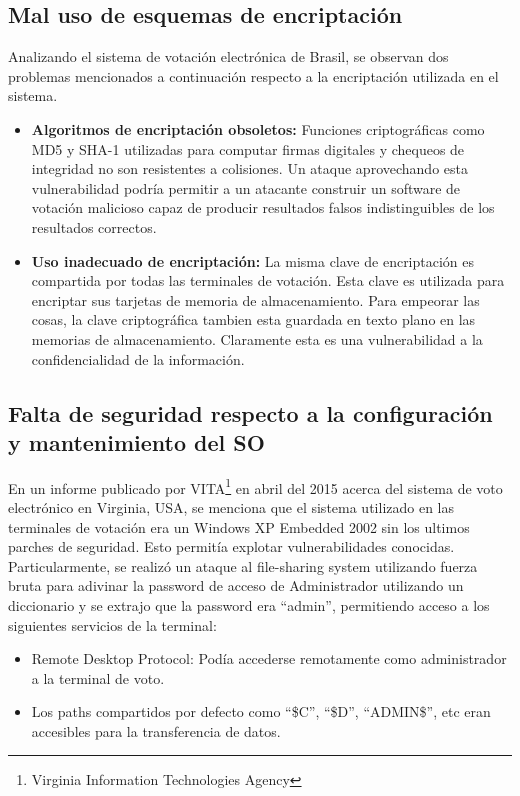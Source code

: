 \subsection{Mal uso de esquemas de encriptación}
Analizando el sistema de votación electrónica de Brasil, se observan dos problemas mencionados a continuación respecto a la encriptación utilizada en el sistema\cite{aranha}.
\begin{itemize}
	\item \textbf{Algoritmos de encriptación obsoletos:} Funciones criptográficas como MD5 y SHA-1 utilizadas para computar firmas digitales y chequeos de integridad no son resistentes a colisiones. Un ataque aprovechando esta vulnerabilidad podría permitir a un atacante construir un software de votación malicioso capaz de producir resultados falsos indistinguibles de los resultados correctos.
	\item \textbf{Uso inadecuado de encriptación: } La misma clave de encriptación es compartida por todas las terminales de votación. Esta clave es utilizada para encriptar sus tarjetas de memoria de almacenamiento. Para empeorar las cosas, la clave criptográfica tambien esta guardada en texto plano en las memorias de almacenamiento. Claramente esta es una vulnerabilidad a la confidencialidad de la información.
\end{itemize}


\subsection{Falta de seguridad respecto a la configuración y mantenimiento del SO}
En un informe publicado por VITA\footnote{Virginia Information Technologies Agency} en abril del 2015 acerca del sistema de voto electrónico en Virginia, USA, se menciona que el sistema utilizado en las terminales de votación era un Windows XP Embedded 2002 sin los ultimos parches de seguridad. Esto permitía explotar vulnerabilidades conocidas. Particularmente, se realizó un ataque al file-sharing system utilizando fuerza bruta para adivinar la password de acceso de Administrador utilizando un  diccionario y se extrajo que la password era ``admin'', permitiendo acceso a los siguientes servicios de la terminal:

\begin{itemize}
	\item Remote Desktop Protocol: Podía accederse remotamente como administrador a la terminal de voto.
	\item Los paths compartidos por defecto como ``\$C'', ``\$D'', ``ADMIN\$'', etc eran accesibles para la transferencia de datos.
\end{itemize}

